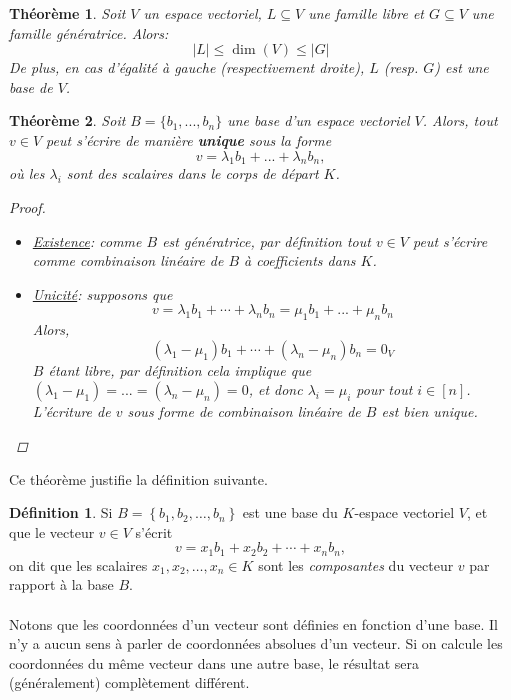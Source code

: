 \documentclass[oneside,12pt,french,table]{book}
\newtheorem{theorem}{Théorème}[section]
\theoremstyle{definition}
\theoremstyle{definition}
\theoremstyle{definition}
\newtheorem{definition}{Définition}[chapter]
\begin{document}
\begin{theorem}
    Soit $V$ un espace vectoriel, $L \subseteq V$ une famille libre et $G \subseteq V$ une famille génératrice. Alors:
    $$\vert L \vert \leq \dim(V) \leq \vert G \vert$$
    De plus, en cas d'égalité à gauche (respectivement droite), $L$ (resp. $G$) est une base de $V$.
\end{theorem}
\begin{theorem}
    Soit $B = \{ b_1,...,b_n \}$ une base d'un espace vectoriel $V$. Alors, tout $v \in V$ peut s'écrire de manière \textbf{unique} sous la forme
    $$v = \lambda_1 b_1 + ... + \lambda_n b_n,$$
    où les $\lambda_i$ sont des scalaires dans le corps de départ $K$.
    \begin{proof} \hspace{1em}
    \begin{itemize}
        \item \underline{Existence}: comme $B$ est génératrice, par définition tout $v \in V$ peut s'écrire comme combinaison linéaire de $B$ à coefficients dans $K$.
        \item \underline{Unicité}: supposons que $$v = \lambda_1 b_1 + \cdots + \lambda_n b_n = \mu_1 b_1 + ... + \mu_n b_n$$
        Alors, $$ (\lambda_1 - \mu_1) b_1 + \cdots + (\lambda_n - \mu_n) b_n = 0_V$$
        $B$ étant libre, par définition cela implique que $(\lambda_1 - \mu_1) = ... = (\lambda_n - \mu_n) = 0$, et donc $\lambda_i = \mu_i$ pour tout $i \in [n]$.
        L'écriture de $v$ sous forme de combinaison linéaire de $B$ est bien unique.
    \end{itemize}
    \end{proof}
\end{theorem}
\noindent Ce théorème justifie la définition suivante.
    \begin{definition}
        Si $B=\left\{b_{1}, b_{2}, \ldots, b_{n}\right\}$ est une base du $K$-espace vectoriel $V$, et que le vecteur $v \in V$ s'écrit
        $$
        v=x_{1} b_{1}+x_{2} b_{2}+\cdots+x_{n} b_{n},
        $$
        on dit que les scalaires $x_{1}, x_{2}, \ldots, x_{n} \in K$ sont les \textit{composantes} du vecteur $v$ par rapport à la base $B$. \\ \\
        Notons que les coordonnées d'un vecteur sont définies en fonction d'une base. Il n'y a aucun sens à parler de coordonnées absolues d'un vecteur. Si on calcule les coordonnées du même vecteur dans une autre base, le résultat sera (généralement) complètement différent.
    \end{definition}
\end{document}
